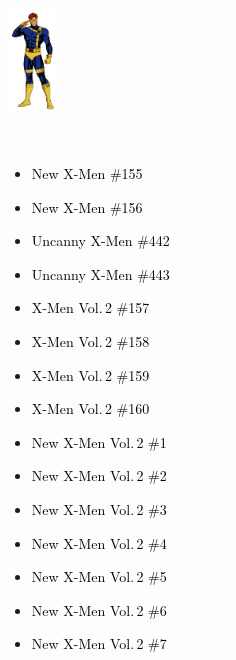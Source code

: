 \documentclass[12pt]{article}
\newcommand{\checkbox}{\raisebox{0.0ex}{\fbox{\rule{0ex}{1.5ex} \rule{1.5ex}{0ex}}}}
\begin{document}
\begin{center}
    \vspace*{2cm}
    \includegraphics[width=0.1\textwidth]{cyclops.png}
    \vspace{0.3cm}

    {\Huge \textbf{\textcolor{white}{X-Men Chronological Checklist}}}
\end{center}

\vspace{0.3cm}
\noindent
\begin{tcolorbox}[
  colback=white!95!gray,
  colframe=black,
  width=\textwidth,
  arc=4mm,
  auto outer arc,
  boxrule=0.8pt,
  left=8pt,right=8pt,top=8pt,bottom=8pt
]
\begin{itemize}[left=0pt,label={\checkbox}]
  \item \textcolor{black}{New X-Men \#155}
  \item \textcolor{black}{New X-Men \#156}
  \item \textcolor{black}{Uncanny X-Men \#442}
  \item \textcolor{black}{Uncanny X-Men \#443}
  \item \textcolor{black}{X-Men Vol.\,2 \#157}
  \item \textcolor{black}{X-Men Vol.\,2 \#158}
  \item \textcolor{black}{X-Men Vol.\,2 \#159}
  \item \textcolor{black}{X-Men Vol.\,2 \#160}
  \item \textcolor{black}{New X-Men Vol.\,2 \#1}
  \item \textcolor{black}{New X-Men Vol.\,2 \#2}
  \item \textcolor{black}{New X-Men Vol.\,2 \#3}
  \item \textcolor{black}{New X-Men Vol.\,2 \#4}
  \item \textcolor{black}{New X-Men Vol.\,2 \#5}
  \item \textcolor{black}{New X-Men Vol.\,2 \#6}
  \item \textcolor{black}{New X-Men Vol.\,2 \#7}
\end{itemize}
\end{tcolorbox}
\end{document}
